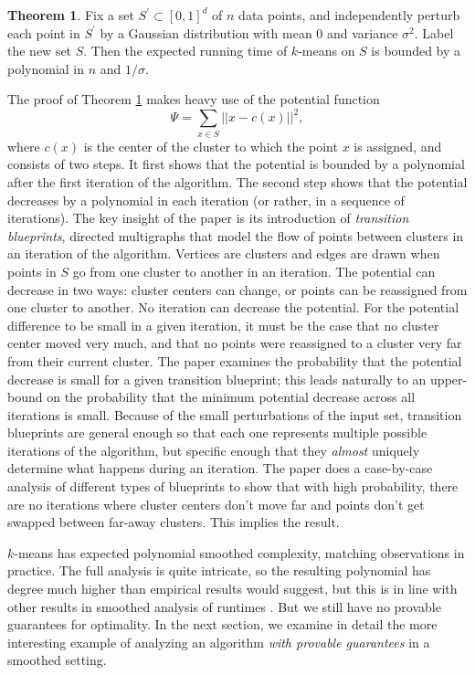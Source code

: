 \documentclass[11pt]{article}
\theoremstyle{definition}
\newtheorem{theorem}{Theorem}
\begin{document}
\begin{theorem}
\label{sakmeans}
Fix a set $S^{\prime} \subset [0,1]^d$ of $n$ data points, and
independently perturb each point in $S^{\prime}$ by a Gaussian
distribution with mean 0 and variance $\sigma^2$. Label the new set
$S$. Then the expected running time of $k$-means on $S$ is bounded by
a polynomial in $n$ and $1/\sigma$.
\end{theorem}
The proof of Theorem \ref{sakmeans} makes heavy use of the potential
function $$\Psi = \sum_{x \in S}||x - c(x)||^2,$$ where $c(x)$ is the
center of the cluster to which the point $x$ is assigned, and consists
of two steps. It first shows that the potential is bounded by a
polynomial after the first iteration of the algorithm. The second step
shows that the potential decreases by a polynomial in each iteration
(or rather, in a sequence of iterations). The key insight of the paper
is its introduction of \emph{transition blueprints}, directed
multigraphs that model the flow of points between clusters in an
iteration of the algorithm. Vertices are clusters and edges are drawn when points in $S$ go from one cluster to another in an iteration. The potential can decrease in two ways:
cluster centers can change, or points can be reassigned from one
cluster to another. No iteration can decrease the potential. For the
potential difference to be small in a given iteration, it must be the
case that no cluster center moved very much, and that no points were
reassigned to a cluster very far from their current cluster. The paper
examines the probability that the potential decrease is small for a
given transition blueprint; this leads naturally to an upper-bound on
the probability that the minimum potential decrease across all iterations is small.
Because of the small perturbations of the input set, transition blueprints are general enough so that each one represents multiple possible iterations of the algorithm, but specific enough that they \emph{almost} uniquely determine what happens during an iteration. The paper does a case-by-case analysis of different types of blueprints to show that with high probability, there are no iterations where cluster centers don't move far and points don't get swapped between far-away clusters. This implies the result.

$k$-means has expected polynomial smoothed complexity, matching observations
in practice. The full analysis is quite intricate, so the resulting
polynomial has degree much higher than empirical results would
suggest, but this is in line with other results in smoothed analysis
of runtimes \cite{SAtwo}. But we still have no provable guarantees for
optimality. In the next section, we examine in detail the more interesting example of analyzing an algorithm
\emph{with provable guarantees} in a smoothed setting.
\end{document}
